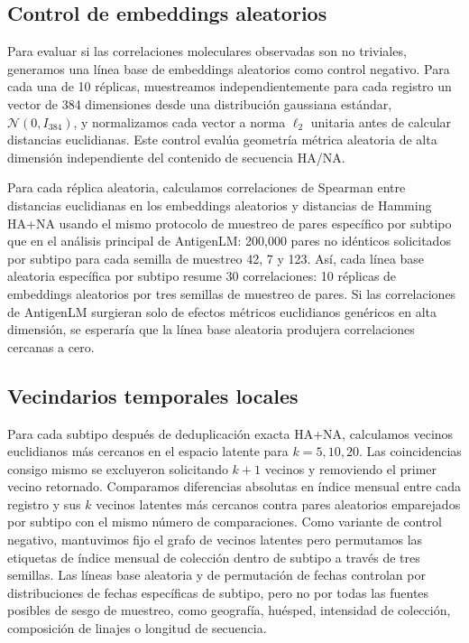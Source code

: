 \documentclass[11pt]{article}
\begin{document}
\subsection{Control de embeddings aleatorios}

Para evaluar si las correlaciones moleculares observadas son no triviales, generamos una línea base de embeddings aleatorios como control negativo. Para cada una de 10 réplicas, muestreamos independientemente para cada registro un vector de 384 dimensiones desde una distribución gaussiana estándar, $\mathcal{N}(0,I_{384})$, y normalizamos cada vector a norma $\ell_2$ unitaria antes de calcular distancias euclidianas. Este control evalúa geometría métrica aleatoria de alta dimensión independiente del contenido de secuencia HA/NA.

Para cada réplica aleatoria, calculamos correlaciones de Spearman entre distancias euclidianas en los embeddings aleatorios y distancias de Hamming HA+NA usando el mismo protocolo de muestreo de pares específico por subtipo que en el análisis principal de AntigenLM: 200,000 pares no idénticos solicitados por subtipo para cada semilla de muestreo 42, 7 y 123. Así, cada línea base aleatoria específica por subtipo resume 30 correlaciones: 10 réplicas de embeddings aleatorios por tres semillas de muestreo de pares. Si las correlaciones de AntigenLM surgieran solo de efectos métricos euclidianos genéricos en alta dimensión, se esperaría que la línea base aleatoria produjera correlaciones cercanas a cero.

\subsection{Vecindarios temporales locales}

Para cada subtipo después de deduplicación exacta HA+NA, calculamos vecinos euclidianos más cercanos en el espacio latente para $k=5,10,20$. Las coincidencias consigo mismo se excluyeron solicitando $k+1$ vecinos y removiendo el primer vecino retornado. Comparamos diferencias absolutas en índice mensual entre cada registro y sus $k$ vecinos latentes más cercanos contra pares aleatorios emparejados por subtipo con el mismo número de comparaciones. Como variante de control negativo, mantuvimos fijo el grafo de vecinos latentes pero permutamos las etiquetas de índice mensual de colección dentro de subtipo a través de tres semillas. Las líneas base aleatoria y de permutación de fechas controlan por distribuciones de fechas específicas de subtipo, pero no por todas las fuentes posibles de sesgo de muestreo, como geografía, huésped, intensidad de colección, composición de linajes o longitud de secuencia.
\end{document}
